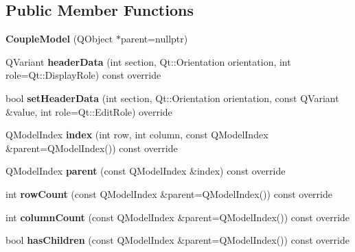 \subsection*{Public Member Functions}
\begin{DoxyCompactItemize}
\item 
\mbox{\label{class_couple_model_a3c9808bc9b720729e2e75023586ea502}} 
{\bfseries Couple\+Model} (Q\+Object $\ast$parent=nullptr)
\item 
\mbox{\label{class_couple_model_aacc790c4e3976b3a23be6b7e697ec9f4}} 
Q\+Variant {\bfseries header\+Data} (int section, Qt\+::\+Orientation orientation, int role=Qt\+::\+Display\+Role) const override
\item 
\mbox{\label{class_couple_model_aa6899673adb2e1e0dbc407c82b192aec}} 
bool {\bfseries set\+Header\+Data} (int section, Qt\+::\+Orientation orientation, const Q\+Variant \&value, int role=Qt\+::\+Edit\+Role) override
\item 
\mbox{\label{class_couple_model_ae165910a585e30e630839eaa91d06f66}} 
Q\+Model\+Index {\bfseries index} (int row, int column, const Q\+Model\+Index \&parent=Q\+Model\+Index()) const override
\item 
\mbox{\label{class_couple_model_a8cdfe3eb76b49e5dfa5c4344ef40f9f5}} 
Q\+Model\+Index {\bfseries parent} (const Q\+Model\+Index \&index) const override
\item 
\mbox{\label{class_couple_model_a1cbf76c2b2e8e8a85418bbac821ed564}} 
int {\bfseries row\+Count} (const Q\+Model\+Index \&parent=Q\+Model\+Index()) const override
\item 
\mbox{\label{class_couple_model_a0dc2f84edbda8bf822541a94a7c8760d}} 
int {\bfseries column\+Count} (const Q\+Model\+Index \&parent=Q\+Model\+Index()) const override
\item 
\mbox{\label{class_couple_model_a8114d27eab635a3fc65951abbeb47bfe}} 
bool {\bfseries has\+Children} (const Q\+Model\+Index \&parent=Q\+Model\+Index()) const override
\item 
\mbox{\label{class_couple_model_a359ffb5fd12cf3cd99e737e11b269ab9}} 

\end{DoxyCompactItemize}
